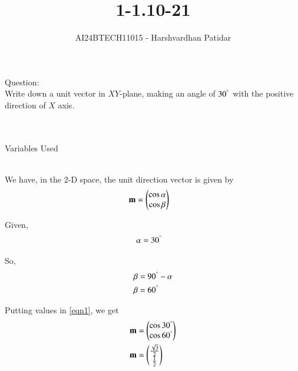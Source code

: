 \documentclass[journal]{IEEEtran}
\begin{document}

\vspace{3cm}

\title{1-1.10-21}
\author{AI24BTECH11015 - Harshvardhan Patidar}
 \maketitle
{\let\newpage\relax\maketitle}

\renewcommand{\thefigure}{\theenumi}
\renewcommand{\thetable}{\theenumi}
\setlength{\intextsep}{10pt} %


\renewcommand{\thetable}{\theenumi}

Question: \\
	Write down a unit vector in $XY$-plane, making an angle of $30^{\degree}$ with the positive direction of $X$ axis. \\ \\

\solution \\
		\begin{table}[h!]    
  			\centering
  			
  			\caption{Variables Used}
  			\label{tab1-1.10-21}
		\end{table}\\


	We have, in the $2$-D space, the unit direction vector is given by
	\begin{align}
		\mathbf{m} &= \begin{pmatrix}\cos \alpha \\ \cos \beta\end{pmatrix}\label{eqn1} 
	\end{align}

	Given, 
	\begin{align}
		\alpha &= 30^{\degree} 
	\end{align}

	So,
	\begin{align}
		\beta &= 90^{\degree} - \alpha\\
		\beta &= 60^{\degree}
	\end{align}

	Putting values in \eqref{eqn1}, we get
	\begin{align}
		\mathbf{m} &= \begin{pmatrix}\cos 30^{\degree} \\ \cos 60^{\degree}\end{pmatrix}\\
		\mathbf{m} &= \begin{pmatrix}\frac{\sqrt{3}}{2} \\ \frac{1}{2}\end{pmatrix}	
	\end{align}
\end{document}
